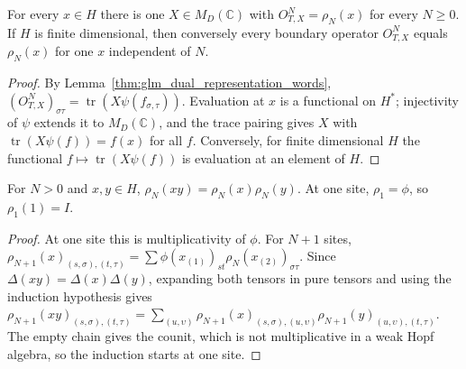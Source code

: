 \begin{lemma}
    \label{thm:glm_wha_boundary_realization}
    \leanok
    For every $x\in H$ there is one $X\in M_D(\mathbb C)$ with
    $O^N_{T,X}=\rho_N(x)$ for every $N\geq0$. If $H$ is finite dimensional,
    then conversely every boundary operator $O^N_{T,X}$ equals $\rho_N(x)$
    for one $x$ independent of $N$.
\end{lemma}
\begin{proof}
    \leanok
    By Lemma~\ref{thm:glm_dual_representation_words},
    $(O^N_{T,X})_{\sigma\tau}=\operatorname{tr}(X\psi(f_{\sigma,\tau}))$.
    Evaluation at $x$ is a functional on $H^*$; injectivity of $\psi$ extends
    it to $M_D(\mathbb C)$, and the trace pairing gives $X$ with
    $\operatorname{tr}(X\psi(f))=f(x)$ for all $f$. Conversely, for finite
    dimensional $H$ the functional $f\mapsto\operatorname{tr}(X\psi(f))$ is
    evaluation at an element of $H$.
\end{proof}

\begin{lemma}
    \label{thm:glm_wha_represented_coproduct_mul}
    \leanok
    For $N>0$ and $x,y\in H$, $\rho_N(xy)=\rho_N(x)\rho_N(y)$.
    At one site, $\rho_1=\phi$, so $\rho_1(1)=I$.
\end{lemma}
\begin{proof}
    \leanok
    At one site this is multiplicativity of $\phi$. For $N+1$ sites,
    $\rho_{N+1}(x)_{(s,\sigma),(t,\tau)}
        =\sum\phi(x_{(1)})_{st}\rho_N(x_{(2)})_{\sigma\tau}$.
    Since $\Delta(xy)=\Delta(x)\Delta(y)$, expanding both tensors in pure
    tensors and using the induction hypothesis gives
    $\rho_{N+1}(xy)_{(s,\sigma),(t,\tau)}
        =\sum_{(u,\upsilon)}\rho_{N+1}(x)_{(s,\sigma),(u,\upsilon)}
        \rho_{N+1}(y)_{(u,\upsilon),(t,\tau)}$.
    The empty chain gives the counit, which is not multiplicative in a weak
    Hopf algebra, so the induction starts at one site.
\end{proof}

